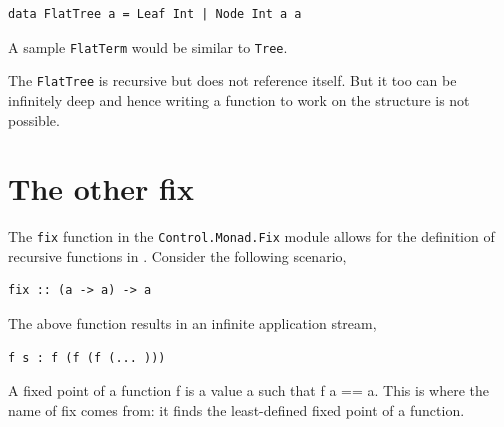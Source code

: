\documentclass[thesis-solanki.tex]{subfiles}
\begin{document}
\begin{verbatim}
data FlatTree a = Leaf Int | Node Int a a
\end{verbatim}  

A sample \texttt{FlatTerm} would be similar to \texttt{Tree}. 

The \texttt{FlatTree} is recursive but does not reference itself. But it too can be infinitely deep and hence writing a function to work on the structure
is not possible.  

\section{The other fix}

The \texttt{fix} function in the \texttt{Control.Monad.Fix} module allows for the definition of recursive functions in . Consider the 
following scenario,

\begin{verbatim}
fix :: (a -> a) -> a
\end{verbatim}
The above function results in an infinite application stream,

\begin{verbatim}
f s : f (f (f (... )))
\end{verbatim} 

A fixed point of a function f is a value a such that f a == a. This is where the name of fix comes from: it finds the least-defined fixed 
point of a function.
\end{document}
